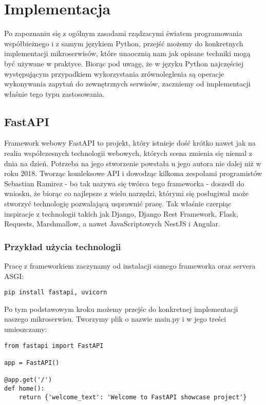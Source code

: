 \chapter{Implementacja}

Po zapoznaniu się z ogólnym zasadami rządzacymi światem programowania współbieżnego i z samym językiem Python, przejść możemy do konkretnych implementacji mikroserwisów, które unaocznią nam jak opisane techniki mogą być używane w praktyce. Biorąc pod uwagę, że w języku Python najczęściej występującym przypadkiem wykorzystania zrównoleglenia są operacje wykonywania zapytań do zewnętrznych serwisów, zaczniemy od implementacji właśnie tego typu zastosowania.


\section{FastAPI}
Framework webowy FastAPI to projekt, który istnieje dość krótko nawet jak na realia współczesnych technologii webowych, których scena zmienia się niemal z dnia na dzień. Potrzeba na jego stworzenie powstała u jego autora nie dalej niż w roku 2018.  Tworząc komleksowe API i dowodząc kilkoma zespołami programistów Sebastian Ramirez - bo tak nazywa się twórca tego frameworka - doszedł do wniosku, że biorąc co najlepsze z wielu narzędzi, którymi się posługiwał może stworzyć technologię pozwalającą usprawnić pracę. Tak właśnie czerpiąc inspiracje z technologii takich jak Django, Django Rest Framework, Flask, Requests, Marshmallow, a nawet JavaScriptowych NestJS i Angular.

\subsection{Przykład użycia technologii}
Pracę z frameworkiem zaczynamy od instalacji samego frameworka oraz servera ASGI:
\begin{lstlisting}
pip install fastapi, uvicorn
\end{lstlisting}
Po tym podstawowym kroku możemy przejśc do konkretnej implementacji naszego mikroserwisu. Tworzymy plik o nazwie main.py i w jego treści umieszczamy:

\begin{lstlisting}
from fastapi import FastAPI

app = FastAPI()

@app.get('/')
def home():
    return {'welcome_text': 'Welcome to FastAPI showcase project'}
\end{lstlisting}

